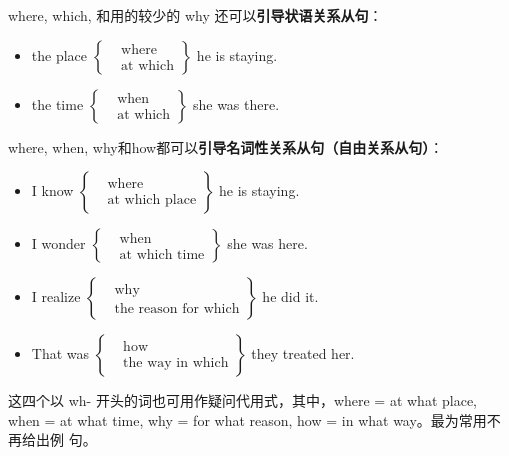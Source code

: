 where, which, 和用的较少的 why 还可以\textbf{引导状语关系从句}：
\begin{itemize}
\item the place
    $\left\{
      \begin{aligned}
        &\text{where}\\
        &\text{at which}
      \end{aligned}
      \right\} $ he is staying.

\item the time
    $\left\{
      \begin{aligned}
        &\text{when}\\
        &\text{at which}
      \end{aligned}
      \right\} $ she was there.
\end{itemize}

where, when, why和how都可以\textbf{引导名词性关系从句（自由关系从句）}：
\begin{itemize}
\item I know
    $\left\{
      \begin{aligned}
        &\text{where}\\
        &\text{at which place}
      \end{aligned}
      \right\} $ he is staying.

\item I wonder
    $\left\{
      \begin{aligned}
        &\text{when}\\
        &\text{at which time}
      \end{aligned}
      \right\} $ she was here.

\item I realize
    $\left\{
      \begin{aligned}
        &\text{why}\\
        &\text{the reason for which}
      \end{aligned}
      \right\} $ he did it.

\item That was
    $\left\{
      \begin{aligned}
        &\text{how}\\
        &\text{the way in which}
      \end{aligned}
      \right\} $ they treated her.
\end{itemize}

这四个以 wh- 开头的词也可用作疑问代用式，其中，where = at what place, when =
at what time, why = for what reason, how = in what way。最为常用不再给出例
句。


